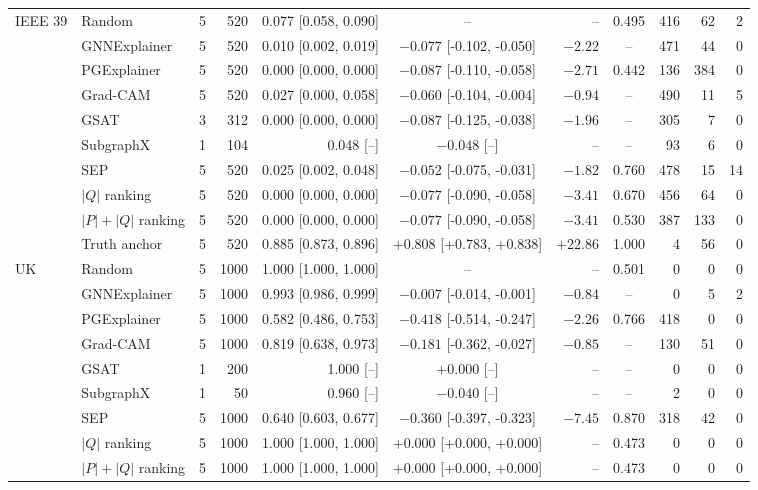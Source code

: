 \begin{table}[!htbp]
{\begin{tabular}{llrrrcrcrrr}
\midrule
\multirow{10}{*}{IEEE 39} & Random & 5 & 520 & 0.077 [0.058, 0.090] & -- & -- & 0.495 & 416 & 62 & 2 \\
 & GNNExplainer & 5 & 520 & 0.010 [0.002, 0.019] & $-0.077$ [-0.102, -0.050] & $-2.22$ & -- & 471 & 44 & 0 \\
 & PGExplainer & 5 & 520 & 0.000 [0.000, 0.000] & $-0.087$ [-0.110, -0.058] & $-2.71$ & 0.442 & 136 & 384 & 0 \\
 & Grad-CAM & 5 & 520 & 0.027 [0.000, 0.058] & $-0.060$ [-0.104, -0.004] & $-0.94$ & -- & 490 & 11 & 5 \\
 & GSAT & 3 & 312 & 0.000 [0.000, 0.000] & $-0.087$ [-0.125, -0.038] & $-1.96$ & -- & 305 & 7 & 0 \\
 & SubgraphX & 1 & 104 & 0.048 [--] & $-0.048$ [--] & -- & -- & 93 & 6 & 0 \\
 & SEP & 5 & 520 & 0.025 [0.002, 0.048] & $-0.052$ [-0.075, -0.031] & $-1.82$ & 0.760 & 478 & 15 & 14 \\
 & $|Q|$ ranking & 5 & 520 & 0.000 [0.000, 0.000] & $-0.077$ [-0.090, -0.058] & $-3.41$ & 0.670 & 456 & 64 & 0 \\
 & $|P|+|Q|$ ranking & 5 & 520 & 0.000 [0.000, 0.000] & $-0.077$ [-0.090, -0.058] & $-3.41$ & 0.530 & 387 & 133 & 0 \\
 & Truth anchor & 5 & 520 & 0.885 [0.873, 0.896] & $+0.808$ [+0.783, +0.838] & $+22.86$ & 1.000 & 4 & 56 & 0 \\
\midrule
\multirow{10}{*}{UK} & Random & 5 & 1000 & 1.000 [1.000, 1.000] & -- & -- & 0.501 & 0 & 0 & 0 \\
 & GNNExplainer & 5 & 1000 & 0.993 [0.986, 0.999] & $-0.007$ [-0.014, -0.001] & $-0.84$ & -- & 0 & 5 & 2 \\
 & PGExplainer & 5 & 1000 & 0.582 [0.486, 0.753] & $-0.418$ [-0.514, -0.247] & $-2.26$ & 0.766 & 418 & 0 & 0 \\
 & Grad-CAM & 5 & 1000 & 0.819 [0.638, 0.973] & $-0.181$ [-0.362, -0.027] & $-0.85$ & -- & 130 & 51 & 0 \\
 & GSAT & 1 & 200 & 1.000 [--] & $+0.000$ [--] & -- & -- & 0 & 0 & 0 \\
 & SubgraphX & 1 & 50 & 0.960 [--] & $-0.040$ [--] & -- & -- & 2 & 0 & 0 \\
 & SEP & 5 & 1000 & 0.640 [0.603, 0.677] & $-0.360$ [-0.397, -0.323] & $-7.45$ & 0.870 & 318 & 42 & 0 \\
 & $|Q|$ ranking & 5 & 1000 & 1.000 [1.000, 1.000] & $+0.000$ [+0.000, +0.000] & -- & 0.473 & 0 & 0 & 0 \\
 & $|P|+|Q|$ ranking & 5 & 1000 & 1.000 [1.000, 1.000] & $+0.000$ [+0.000, +0.000] & -- & 0.473 & 0 & 0 & 0 \\

\end{tabular}}
\end{table}
